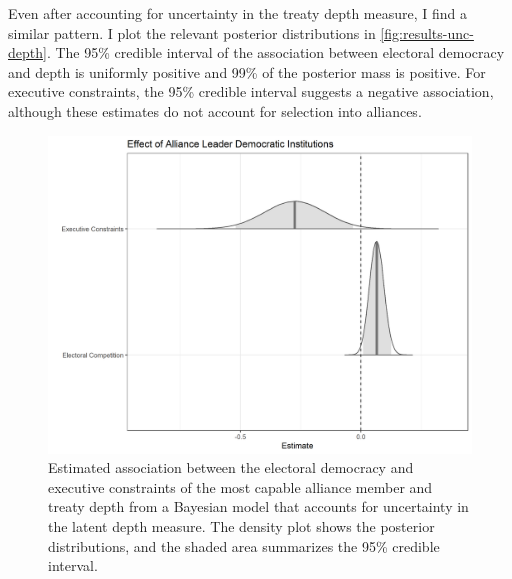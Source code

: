\documentclass[12pt]{article}
\begin{document}
Even after accounting for uncertainty in the treaty depth measure, I find a similar pattern. 
I plot the relevant posterior distributions in \autoref{fig:results-unc-depth}. 
The 95\% credible interval of the association between electoral democracy and depth is uniformly positive and 99\% of the posterior mass is positive. 
For executive constraints, the 95\% credible interval suggests a negative association, although these estimates do not account for selection into alliances. 


\begin{figure}
\includegraphics[width=.95\textwidth]{results-unc-depth.png}  
\caption{Estimated association between the electoral democracy and executive constraints of the most capable alliance member and treaty depth from a Bayesian model that accounts for uncertainty in the latent depth measure. The density plot shows the posterior distributions, and the shaded area summarizes the 95\% credible interval.}
\label{fig:results-unc-depth}
\end{figure}




\newpage

\singlespace
 
 
\end{document}
